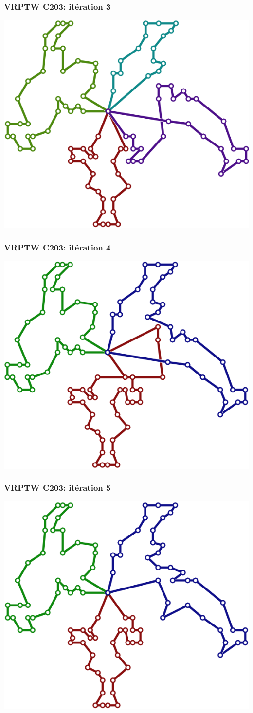 \documentclass[table]{beamer}
\begin{document}
\begin{frame}
  \frametitle{VRPTW C203: itération 3}

  \centering
  \includegraphics[width=0.7\linewidth]{../article/images/C203-3}
\end{frame}

\begin{frame}
  \frametitle{VRPTW C203: itération 4}

  \centering
  \includegraphics[width=0.7\linewidth]{../article/images/C203-4}
\end{frame}

\begin{frame}
  \frametitle{VRPTW C203: itération 5}

  \centering
  \includegraphics[width=0.7\linewidth]{../article/images/C203-5}
\end{frame}
\end{document}
